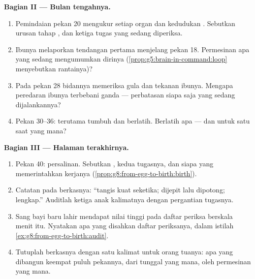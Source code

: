 \begin{problem}
\medskip\noindent\textbf{Bagian II --- Bulan tengahnya.}
\begin{enumerate}[resume]
  \item Pemindaian pekan 20 mengukur setiap organ dan
        kedudukan . Sebutkan urusan tahap
        , dan ketiga tugas  yang sedang
        diperiksa.
  \item Ibunya melaporkan tendangan pertama menjelang pekan
        18. Permesinan apa yang sedang mengumumkan dirinya
        (\cref{prop:g5:brain-in-command:loop} menyebutkan
        rantainya)?
  \item Pada pekan 28 bidannya memeriksa gula dan tekanan
         ibunya. Mengapa peredaran  ibunya
        terbebani ganda --- perbatasan siapa saja yang
        sedang dijalankannya?
  \item Pekan 30--36:  terutama tumbuh dan
         berlatih. Berlatih apa --- dan untuk
        satu saat yang mana?
\end{enumerate}

\medskip\noindent\textbf{Bagian III --- Halaman terakhirnya.}
\begin{enumerate}[resume]
  \item Pekan 40: persalinan. Sebutkan , kedua
        tugasnya, dan siapa yang memerintahkan kerjanya
        (\cref{prop:g8:from-egg-to-birth:birth}).
  \item Catatan  pada berkasnya: ``tangis kuat
        seketika;  dijepit lalu dipotong; 
        lengkap.'' Auditlah ketiga anak kalimatnya dengan
        pergantian tugasnya.
  \item Sang bayi baru lahir mendapat nilai tinggi pada
        daftar periksa berskala menit itu. Nyatakan apa yang
        disahkan daftar periksanya, dalam istilah
        \cref{ex:g8:from-egg-to-birth:audit}.
  \item Tutuplah berkasnya dengan satu kalimat untuk orang
        tuanya: apa yang dibangun keempat puluh pekannya,
        dari  tunggal yang mana, oleh permesinan yang mana.
\end{enumerate}
\end{problem}
